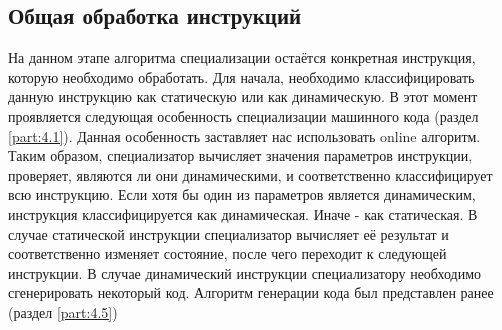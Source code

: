 \subsection{Общая обработка инструкций}
На данном этапе алгоритма специализации остаётся конкретная инструкция, которую необходимо обработать. Для начала, необходимо классифицировать данную инструкцию как статическую или как динамическую. В этот момент проявляется следующая особенность специализации машинного кода (раздел \ref{part:4.1}). Данная особенность заставляет нас использовать online алгоритм. Таким образом, специализатор вычисляет значения параметров инструкции, проверяет, являются ли они динамическими, и соответственно классифицирует всю инструкцию. Если хотя бы один из параметров является динамическим, инструкция классифицируется как динамическая. Иначе - как статическая.
В случае статической инструкции специализатор вычисляет её результат и соответственно изменяет состояние, после чего переходит к следующей инструкции.
В случае динамический инструкции специализатору необходимо сгенерировать некоторый код. Алгоритм генерации кода был представлен ранее (раздел \ref{part:4.5})

